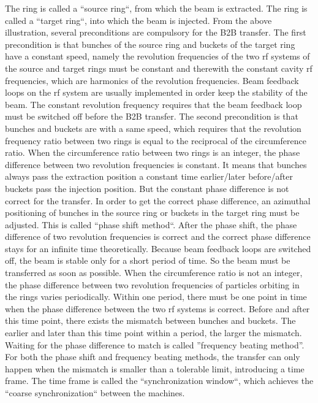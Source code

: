 The ring is called a ``source ring``, from which the beam is extracted. The ring is called a ``target ring``, into which the beam is injected. From the above illustration, several preconditions are compulsory for the B2B transfer. The first precondition is that bunches of the source ring and buckets of the target ring have a constant speed, namely the revolution frequencies of the two rf systems of the source and target rings must be constant and therewith the constant cavity rf frequencies, which are harmonics of the revolution frequencies. Beam feedback loops on the rf system are usually implemented in order keep the stability of the beam. The constant revolution frequency requires that the beam feedback loop must be switched off before the B2B transfer. The second precondition is that bunches and buckets are with a same speed, which requires that the revolution frequency ratio between two rings is equal to the reciprocal of the circumference ratio. When the circumference ratio between two rings is an integer, the phase difference between two revolution frequencies is constant. It means that bunches always pass the extraction position a constant time earlier/later before/after buckets pass the injection position. But the constant phase difference is not correct for the transfer. In order to get the correct phase difference, an azimuthal positioning of bunches in the source ring or buckets in the target ring must be adjusted. This is called  ``phase shift method``. After the phase shift, the phase difference of two revolution frequencies is correct and the correct phase difference stays for an infinite time theoretically. Because beam feedback loops are switched off, the beam is stable only for a short period of time. So the beam must be transferred as soon as possible. %
When the circumference ratio is not an integer, the phase difference between two revolution frequencies of particles orbiting in the rings varies periodically. Within one period, there must be one point in time when the phase difference between the two rf systems is correct. Before and after this time point, there exists the mismatch between bunches and buckets. The earlier and later than this time point within a period, the larger the mismatch. Waiting for the phase difference to match is called ''frequency beating method''. For both the phase shift and frequency beating methods, the transfer can only happen when the mismatch is smaller than a tolerable limit, introducing a time frame. The time frame is called the ``synchronization window``, which achieves the ``coarse synchronization`` between the machines.

